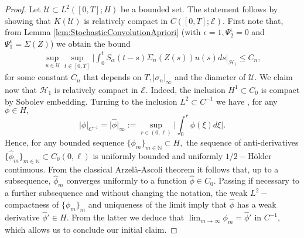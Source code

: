 \documentclass[10pt, reqno]{amsart}
\newcommand{\N}{\mathbb{N}}
\newcommand{\h}{\mathcal{H}}
\newcommand{\e}{\mathcal{E}}
\theoremstyle{definition}
\numberwithin{lem}{section}
\numberwithin{cor}{section}
\numberwithin{prop}{section}
\numberwithin{thm}{section}
\numberwithin{dfn}{section}
\begin{document}
\begin{proof}

Let $\mathcal{U}\subset L^2([0,T];H)$ be a bounded set. The statement follows by showing that $K(\mathcal{U})$ is relatively compact in $C([0,T];\e).$ First note that, from Lemma \ref{lem:StochasticConvolutionApriori} (with $\epsilon=1, \Psi^\epsilon_2=0$ and $\Psi^\epsilon_1=\Sigma(Z)$) we obtain the bound
	\begin{equation}\label{Kcomp}
	\begin{aligned}
	\sup_{u\in\mathcal{U}}\sup_{t\in[0,T]}\bigg|\int_{0}^{t}S_\alpha(t-s)\Sigma_n(Z(s))u(s)ds\bigg|_{\h_1}\leq C_n,
	\end{aligned}
	\end{equation}	
	for some constant $C_n$ that depends on $T, |\sigma_n|_\infty$ and the diameter of $\mathcal{U}.$	We claim now that $\h_1$ is relatively compact in $\mathcal{E}.$ Indeed, the inclusion $H^1\subset C_0$ is compact by Sobolev embedding. Turning to the inclusion $L^2\subset C^{-1}$ we have , for any $\phi\in H,$
	$$|\phi|_{C^{-1}}=\big|\hat{\phi}\big|_{\infty}:=\sup_{r\in(0,\ell)}\bigg|\int_{0}^{r}\phi(\xi)d\xi\bigg|.$$
	Hence, for any bounded sequence $\{\phi_m\}_{m\in\N}\subset{H},$ the sequence of anti-derivatives $\{\hat{\phi}_m\}_{m\in\N}\subset C_0(0,\ell)$ is uniformly bounded and uniformly $1/2-$H\"older continuous. From the classical Arzel\`a-Ascoli theorem it follows that, up to a subsequence, $\hat{\phi}_m$ converges uniformly to a function $\hat{\phi}\in C_0.$ Passing if necessary to a further subsequence and without changing the notation, the weak $L^2-$compactness of $\{\phi_m\}_m$ and uniqueness of the limit imply that $\hat{\phi}$ has a weak derivative $\hat{\phi}'\in H.$ From the latter we deduce that $\lim_{m\to\infty}\phi_m=\hat{\phi}'$ in $C^{-1},$ which allows us to conclude our initial claim.
	

\end{proof}
\end{document}
